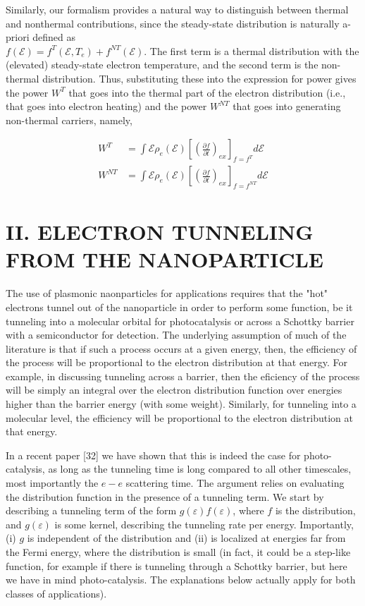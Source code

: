 \documentclass[10pt]{article}
\begin{document}
Similarly, our formalism provides a natural way to distinguish between thermal and nonthermal contributions, since the steady-state distribution is naturally a-priori defined as\\
$f(\mathcal{E})=f^{T}\left(\mathcal{E}, T_{e}\right)+f^{N T}(\mathcal{E})$. The first term is a thermal distribution with the (elevated) steady-state electron temperature, and the second term is the non-thermal distribution. Thus, substituting these into the expression for power gives the power $W^{T}$ that goes into the thermal part of the electron distribution (i.e., that goes into electron heating) and the power $W^{N T}$ that goes into generating non-thermal carriers, namely,


\begin{align*}
W^{T} & =\int \mathcal{E} \rho_{e}(\mathcal{E})\left[\left(\frac{\partial f}{\partial t}\right)_{e x}\right]_{f=f^{T}} d \mathcal{E}  \tag{S15}\\
W^{N T} & =\int \mathcal{E} \rho_{e}(\mathcal{E})\left[\left(\frac{\partial f}{\partial t}\right)_{e x}\right]_{f=f^{N T}} d \mathcal{E} \tag{S16}
\end{align*}


\section*{II. ELECTRON TUNNELING FROM THE NANOPARTICLE}
The use of plasmonic naonparticles for applications requires that the "hot" electrons tunnel out of the nanoparticle in order to perform some function, be it tunneling into a molecular orbital for photocatalysis or across a Schottky barrier with a semiconductor for detection. The underlying assumption of much of the literature is that if such a process occurs at a given energy, then, the efficiency of the process will be proportional to the electron distribution at that energy. For example, in discussing tunneling across a barrier, then the eficiency of the process will be simply an integral over the electron distribution function over energies higher than the barrier energy (with some weight). Similarly, for tunneling into a molecular level, the efficiency will be proportional to the electron distribution at that energy.

In a recent paper [32] we have shown that this is indeed the case for photo-catalysis, as long as the tunneling time is long compared to all other timescales, most importantly the $e-e$ scattering time. The argument relies on evaluating the distribution function in the presence of a tunneling term. We start by describing a tunneling term of the form $g(\varepsilon) f(\varepsilon)$, where $f$ is the distribution, and $g(\varepsilon)$ is some kernel, describing the tunneling rate per energy. Importantly, (i) $g$ is independent of the distribution and (ii) is localized at energies far from the Fermi energy, where the distribution is small (in fact, it could be a step-like function, for example if there is tunneling through a Schottky barrier, but here we have in mind photo-catalysis. The explanations below actually apply for both classes of applications).
\end{document}

